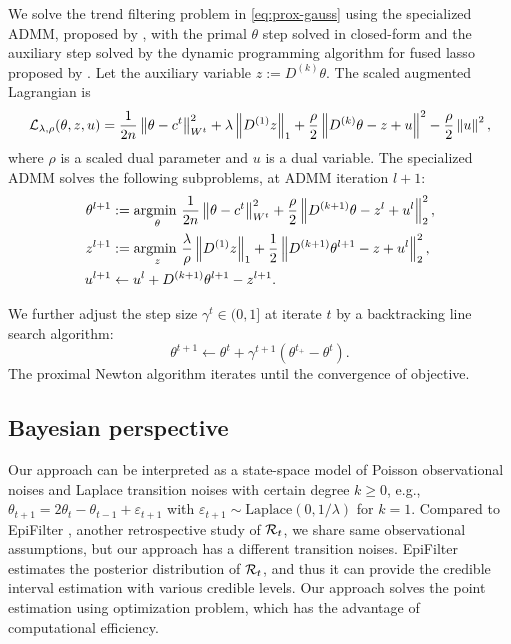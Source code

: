 We solve the trend filtering problem in \eqref{eq:prox-gauss} using the specialized ADMM, proposed by \cite{ramdas2016fast}, with the primal $\theta$ step solved in closed-form and the auxiliary step solved by the dynamic programming algorithm for fused lasso proposed by \cite{johnson2013dynamic}. Let the auxiliary variable $z:= D^{(k)}\theta$. The scaled augmented Lagrangian is $$\mathcal{L}_{\lambda, \rho}(\theta, z, u) = \frac{1}{2n} \left\lVert \theta - c^{t} \right\rVert_{W^t}^2 + \lambda \left\lVert D^{(1)}z \right\rVert_1 + \frac{\rho}{2} \left\lVert D^{(k)}\theta - z + u \right\rVert^2 - \frac{\rho}{2} \left\lVert u \right\rVert^2, $$ where $\rho$ is a scaled dual parameter and $u$ is a dual variable. The specialized ADMM solves the following subproblems, at ADMM iteration $l+1$: 
\begin{equation}
  \begin{split}
      \theta^{l+1} &:= \underset{\theta}{\operatorname*{argmin}\ } \frac{1}{2n} \left\lVert \theta - c^{t} \right\rVert_{W^t}^2 + \frac{\rho}{2} \left\lVert D^{(k+1)} \theta - z^l + u^l \right\rVert_2^2, \\
      z^{l+1} &:= \underset{z}{\operatorname*{argmin}\ } \frac{\lambda}{\rho} \left\lVert D^{(1)} z \right\rVert_1 + \frac{1}{2} \left\lVert D^{(k+1)} \theta^{l+1} - z + u^l \right\rVert_2^2, \\
      u^{l+1} &\leftarrow u^l + D^{(k+1)} \theta^{l+1} - z^{l+1}.
  \end{split}
\end{equation}

We further adjust the step size $\gamma^t \in (0,1]$ at iterate $t$ by a backtracking line search algorithm: 
$$\theta^{t+1} \leftarrow \theta^t + \gamma^{t+1} (\theta^{t_+} - \theta^t).$$ The proximal Newton algorithm iterates until the convergence of objective.


\subsection{Bayesian perspective}

Our approach can be interpreted as a state-space model of Poisson observational noises and Laplace transition noises with certain degree $k\geq 0$, e.g., $\theta_{t+1} = 2\theta_t - \theta_{t-1} + \varepsilon_{t+1}$ with $\varepsilon_{t+1}\sim \mathrm{Laplace}(0,1/\lambda)$ for $k=1$. Compared to EpiFilter \citep{parag2021improved}, another retrospective study of $\mathcal{R}_t$, we share same observational assumptions, but our approach has a different transition noises. 
EpiFilter estimates the posterior distribution of $\mathcal{R}_t$, and thus it can provide the credible interval estimation with various credible levels. Our approach solves the point estimation using optimization problem, which has the advantage of computational efficiency. 
